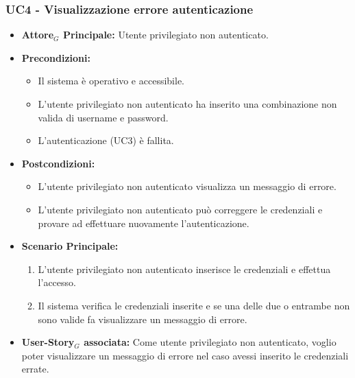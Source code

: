 \documentclass[11pt]{article}
\begin{document}
\begin{justify}
\subsubsection{\textbf{UC4 - Visualizzazione errore autenticazione}}
\begin{itemize}
    \item \textbf{Attore$_G$ Principale:} Utente privilegiato non autenticato.
    \item \textbf{Precondizioni:}
        \begin{itemize}
            \item Il sistema è operativo e accessibile.
            \item L'utente privilegiato non autenticato ha inserito una combinazione non valida di username e password.
            \item L'autenticazione (UC3) è fallita.
        \end{itemize}
    \item \textbf{Postcondizioni:}
        \begin{itemize}
            \item L’utente privilegiato non autenticato visualizza un messaggio di errore.
            \item L’utente privilegiato non autenticato può correggere le credenziali e provare ad effettuare nuovamente l'autenticazione.
        \end{itemize}
    \item \textbf{Scenario Principale:}
        \begin{enumerate}
            \item L'utente privilegiato non autenticato inserisce le credenziali e effettua l'accesso.
            \item Il sistema verifica le credenziali inserite e se una delle due o entrambe non sono valide fa visualizzare un messaggio di errore.
        \end{enumerate}
    \item \textbf{User-Story$_G$ associata:} Come utente privilegiato non autenticato, voglio poter visualizzare un messaggio di errore nel caso avessi inserito le credenziali errate.
\end{itemize}

\end{justify}
\end{document}
